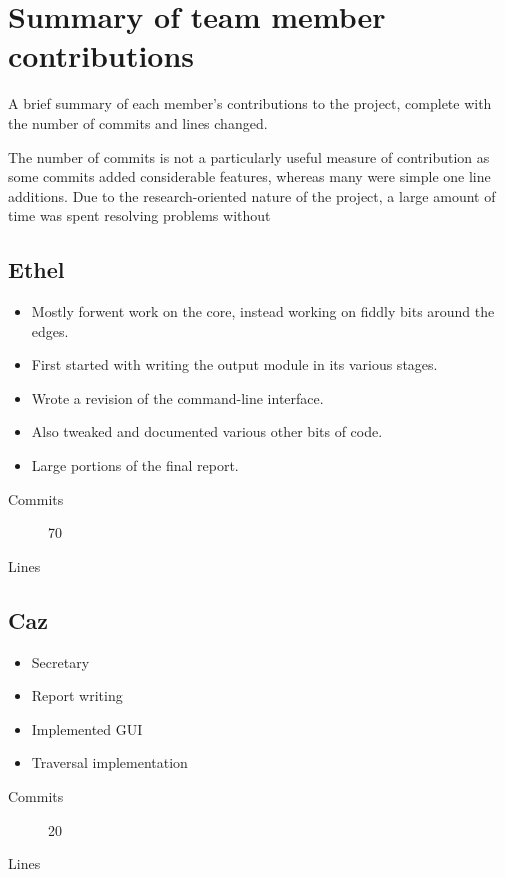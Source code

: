 \section{Summary of team member contributions}
  A brief summary of each member's contributions to the project, complete with the number of commits and lines changed.

  The number of commits is not a particularly useful measure of contribution as some commits added considerable features, whereas many were simple one line additions. 
  Due to the research-oriented nature of the project, a large amount of time was spent resolving problems without 

  \subsection{Ethel}
    \begin{itemize}
      \item Mostly forwent work on the core, instead working on fiddly bits around the edges.
      \item First started with writing the output module in its various stages.
      \item Wrote a revision of the command-line interface.
      \item Also tweaked and documented various other bits of code.
      \item Large portions of the final report.
    \end{itemize}
   
    \begin{description}
      \item[Commits] 70
      \item[Lines]
    \end{description}

  \subsection{Caz}
    \begin{itemize}
    \item Secretary
    \item Report writing 
    \item Implemented GUI
    \item Traversal implementation
    \end{itemize}
    \begin{description}
      \item[Commits] 20
      \item[Lines]
    \end{description}

